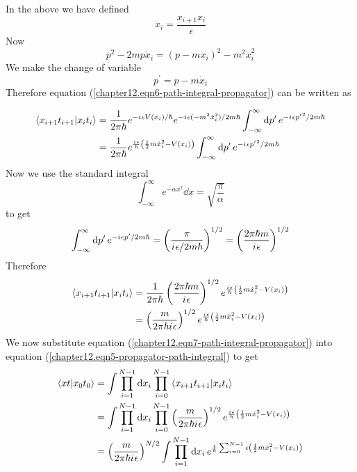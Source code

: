 	In the above we have defined
	\begin{equation}
		\dot{x}_i = \frac{x_{i+1} x_i}{\epsilon}
	\end{equation}
	Now
	\begin{equation}
		p^2 - 2m p \dot{x}_i = (p- m \dot{x}_i)^2 - m^2 \dot{x}_i^2
	\end{equation}
	We make the change of variable
	\begin{equation}
		p^\prime = p -m \dot{x}_i
	\end{equation}
	Therefore equation (\ref{chapter12.eqn6-path-integral-propagator}) can be written as
	
	\begin{align}
		\braket{x_{i+1} t_{i+1}}{x_i t_i} 
		&= \frac{1}{2 \pi \hbar} e^{-{i\mkern1mu} \epsilon V(x_i)/\hbar} e^{-{i\mkern1mu} \epsilon (-m^2 \dot{x}_i^2) / 2 m \hbar}  \int_{-\infty}^{\infty} \dd{p^\prime} e^{-{i\mkern1mu} \epsilon {p^\prime}^2 / 2 m \hbar} \\
		&= \frac{1}{2 \pi \hbar} e^{\frac{{i\mkern1mu} \epsilon}{\hbar} \left(\frac{1}{2} m \dot{x}_i^2 - V(x_i)\right)} \int_{-\infty}^{\infty} \dd{p^\prime} e^{-{i\mkern1mu} \epsilon {p^\prime}^2 / 2 m \hbar}
	\end{align}
	Now we use the standard integral
	\begin{equation}
		\int_{-\infty}^{\infty} e^{-\alpha x^2} \dd{x} = \sqrt{\frac{\pi}{\alpha}}
	\end{equation}
	to get
	\begin{equation}
		\int_{-\infty}^{\infty} \dd{p^\prime} e^{-{i\mkern1mu} \epsilon p^\prime / 2 m \hbar} = \left(\frac{\pi}{{i\mkern1mu} \epsilon/2 m \hbar}\right)^{1/2} = \left(\frac{2 \pi \hbar m}{{i\mkern1mu} \epsilon}\right)^{1/2}
	\end{equation}
	Therefore
	\begin{align}
		\braket{x_{i+1} t_{i+1}}{x_i t_i} 
		&= \frac{1}{2 \pi \hbar} \left(\frac{2 \pi \hbar m}{{i\mkern1mu} \epsilon}\right)^{1/2} e^{\frac{{i\mkern1mu} \epsilon}{\hbar} \left(\frac{1}{2} m \dot{x}_i^2 - V(x_i)\right)} \\
		&= \left(\frac{m}{2\pi\hbar{i\mkern1mu} \epsilon}\right)^{1/2} e^{\frac{{i\mkern1mu} \epsilon}{\hbar} \left(\frac{1}{2} m \dot{x}_i^2 - V(x_i)\right)}
		\label{chapter12.eqn7-path-integral-propagator}
	\end{align}
	We now substitute equation (\ref{chapter12.eqn7-path-integral-propagator}) into equation (\ref{chapter12.eqn5-propagator-path-integral}) to get
	\begin{align}
		\braket{x t}{x_0 t_0} 
		&= \int \prod_{i=1}^{N-1} \dd{x_i} \prod_{i=0}^{N-1} \braket{x_{i+1} t_{i+1}}{x_i t_i}\\
		&= \int \prod_{i=1}^{N-1} \dd{x_i} \prod_{i=0}^{N-1} \left(\frac{m}{2 \pi \hbar {i\mkern1mu} \epsilon}\right)^{1/2} e^{\frac{{i\mkern1mu} \epsilon}{\hbar} \left(\frac{1}{2} m \dot{x}_i^2 - V(x_i)\right)} \\
		&= \left(\frac{m}{2 \pi \hbar {i\mkern1mu} \epsilon}\right)^{N/2} \int \prod_{i=1}^{N-1} \dd{x_i}e^{\frac{{i\mkern1mu}}{\hbar} \sum_{i=0}^{N-1} \epsilon \left(\frac{1}{2} m \dot{x}_i^2 - V(x_i)\right)}
		\label{chapter12.eqn8-path-integral-propagator}
	\end{align}

